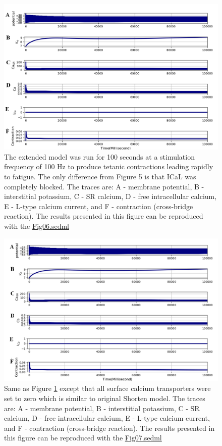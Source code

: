 \documentclass[fleqn,10pt]{physiome}
\begin{document}
\begin{figure}[h!]
\centering
\includegraphics[width=0.9\linewidth]{figure06}
\caption{The extended model was run for 100 seconds at a stimulation frequency of 100 Hz to produce tetanic contractions leading rapidly to fatigue. The only difference from Figure 5 is that ICaL was completely blocked. 
The traces are: A - membrane potential, B - interstitial potassium, C - SR calcium, D - free intracellular calcium, E - L-type calcium current, and F - contraction (cross-bridge reaction). The results presented in this figure can be reproduced with the \href{https://models.physiomeproject.org/workspace/5f4/file/26289d9227fbf4f66ca8106d8bf80ff9a51a5ac6/Fig06.sedml}{Fig06.sedml}}
\label{fig06}
\end{figure}

\begin{figure}[h!]
\centering
\includegraphics[width=0.9\linewidth]{figure06new}
\caption{Same as Figure \ref{fig06} except that all surface calcium transporters were set to zero which is similar to original Shorten model. The traces are: A - membrane potential, B - interstitial potassium, C - SR calcium, D - free intracellular calcium, E - L-type calcium current, and F - contraction (cross-bridge reaction). The results presented in this figure can be reproduced with the \href{https://models.physiomeproject.org/workspace/5f4/file/26289d9227fbf4f66ca8106d8bf80ff9a51a5ac6/Fig07.sedml}{Fig07.sedml}}
\label{fig06new}
\end{figure}
\end{document}
